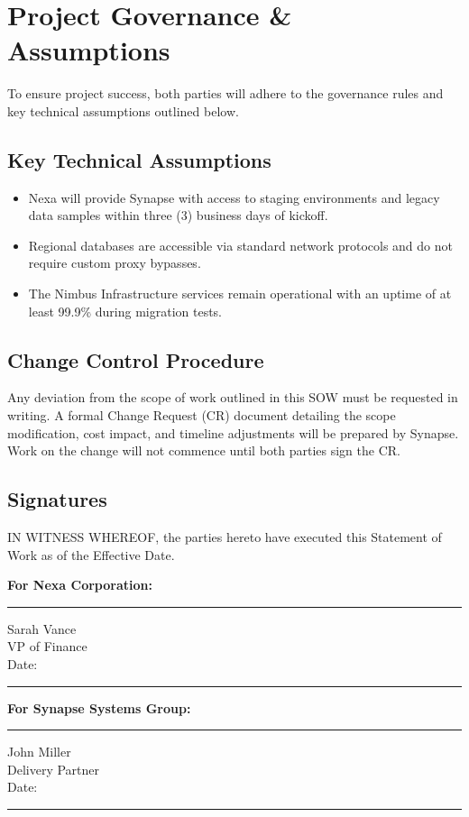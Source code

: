 \section{Project Governance \& Assumptions}
To ensure project success, both parties will adhere to the governance rules and key technical assumptions outlined below.

\subsection{Key Technical Assumptions}
\begin{itemize}[label=\textcolor{secondary}{\faInfoCircle}, leftmargin=*]
  \item Nexa will provide Synapse with access to staging environments and legacy data samples within three (3) business days of kickoff.
  \item Regional databases are accessible via standard network protocols and do not require custom proxy bypasses.
  \item The Nimbus Infrastructure services remain operational with an uptime of at least 99.9\% during migration tests.
\end{itemize}

\subsection{Change Control Procedure}
Any deviation from the scope of work outlined in this SOW must be requested in writing. A formal Change Request (CR) document detailing the scope modification, cost impact, and timeline adjustments will be prepared by Synapse. Work on the change will not commence until both parties sign the CR.

\subsection{Signatures}
IN WITNESS WHEREOF, the parties hereto have executed this Statement of Work as of the Effective Date.

\vspace{1.5cm}
\noindent
\begin{minipage}[t]{0.45\textwidth}
  \textbf{For Nexa Corporation:}
  \vspace{1.2cm}
  
  \rule{\textwidth}{0.5pt}
  Sarah Vance \\
  VP of Finance \\
  Date: \rule{3cm}{0.5pt}
\end{minipage}
\hfill
\begin{minipage}[t]{0.45\textwidth}
  \textbf{For Synapse Systems Group:}
  \vspace{1.2cm}
  
  \rule{\textwidth}{0.5pt}
  John Miller \\
  Delivery Partner \\
  Date: \rule{3cm}{0.5pt}
\end{minipage}
\par
